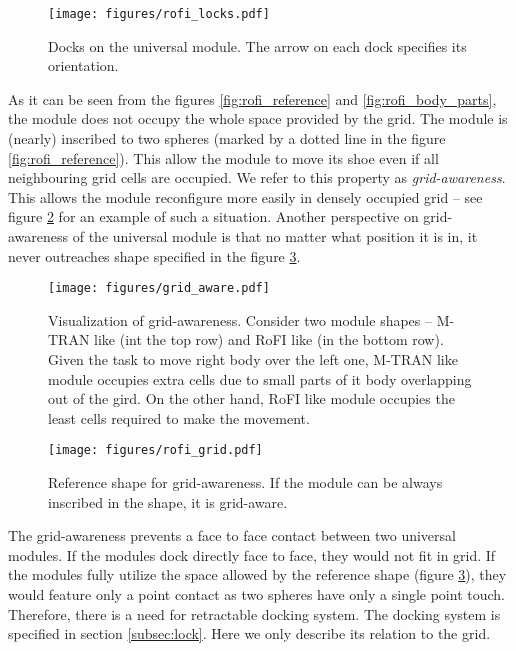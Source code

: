 \begin{figure}
    \centering
    \texttt{[image: figures/rofi\_locks.pdf]}
    \caption{Docks on the universal module. The arrow on each dock specifies its orientation.}
    \label{fig:rofi_locks}
\end{figure}

As it can be seen from the figures \ref{fig:rofi_reference} and
\ref{fig:rofi_body_parts}, the module does not occupy the whole space provided
by the grid. The module is (nearly) inscribed to two spheres (marked by a dotted
line in the figure \ref{fig:rofi_reference}). This allow the module to move its
shoe even if all neighbouring grid cells are occupied. We refer to this property
as \emph{grid-awareness}. This allows the module reconfigure more easily in
densely occupied grid -- see figure \ref{fig:grid_aware} for an example of such
a situation. Another perspective on grid-awareness of the universal module is
that no matter what position it is in, it never outreaches shape specified in
the figure \ref{fig:rofi_grid}.

\begin{figure}
    \centering
    \texttt{[image: figures/grid\_aware.pdf]}
    \caption{Visualization of grid-awareness. Consider two module shapes -- M-TRAN\cite{haruhisa_kurokawa_m-tran_2003}
     like (int the top row) and RoFI like (in the bottom row). Given the task to
     move right body over the left one, M-TRAN like module occupies extra cells
     due to small parts of it body overlapping out of the gird. On the other
     hand, RoFI like module occupies the least cells required to make the
     movement.   }
    \label{fig:grid_aware}
\end{figure}

\begin{figure}
    \centering
    \texttt{[image: figures/rofi\_grid.pdf]}
    \caption{Reference shape for grid-awareness. If the module can be always inscribed in the shape, it is grid-aware.}
    \label{fig:rofi_grid}
\end{figure}

The grid-awareness prevents a face to face contact between two universal
modules. If the modules dock directly face to face, they would not fit in grid.
If the modules fully utilize the space allowed by the reference shape (figure
\ref{fig:rofi_grid}), they would feature only a point contact as two spheres
have only a single point touch. Therefore, there is a need for retractable
docking system. The docking system is specified in section \ref{subsec:lock}.
Here we only describe its relation to the grid.

